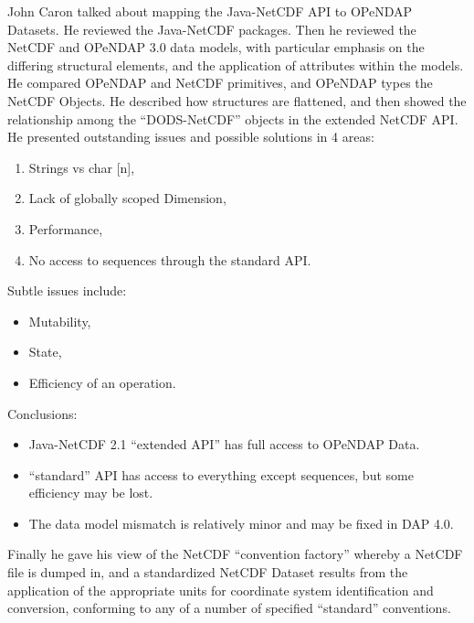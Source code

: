 John Caron talked about mapping the Java-\ac{NetCDF} \ac{API} to \ac{OPeNDAP} Datasets.
He reviewed the Java-\ac{NetCDF} packages.  Then he reviewed the \ac{NetCDF}
and \ac{OPeNDAP} 3.0 data models, with particular emphasis on the differing
structural elements, and the application of attributes within the 
models.  He compared \ac{OPeNDAP} and \ac{NetCDF} primitives, and \ac{OPeNDAP}
types the \ac{NetCDF} Objects.  He described how structures are flattened,
and then showed the relationship among the ``DODS-NetCDF'' objects in
the extended \ac{NetCDF} \ac{API}.  He presented outstanding issues and possible
solutions in 4 areas:

\begin{enumerate}
   \item  Strings vs char [n],
   \item  Lack of globally scoped Dimension,
   \item  Performance,
   \item  No access to sequences through the standard \ac{API}.
\end{enumerate}

Subtle issues include:

\begin{itemize}
  \item  Mutability,
  \item  State,
  \item  Efficiency of an operation.
\end{itemize}

Conclusions:

\begin{itemize}
   \item Java-\ac{NetCDF} 2.1 ``extended \ac{API}'' has full access to \ac{OPeNDAP}
         Data.
   \item ``standard'' \ac{API} has access to everything except sequences,
         but some efficiency may be lost.
   \item The data model mismatch is relatively minor and may be
         fixed in DAP 4.0.
\end{itemize}

Finally he gave his view of the \ac{NetCDF} ``convention factory''
whereby a \ac{NetCDF} file is dumped in, and a standardized
\ac{NetCDF} Dataset results from the application of the appropriate
units for coordinate system identification and conversion, conforming
to any of a number of specified ``standard'' conventions.

%
%
%
%


